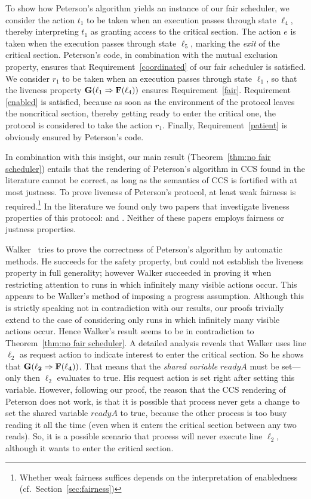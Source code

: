 \documentclass[smallcondensed]{svjour3}
\newcommand{\Thm}[1]{Theorem~\ref{thm:#1}}
\newcommand{\Sect}[1]{Section~\ref{sec:#1}}
\begin{document}
To show how Peterson's algorithm yields an instance of our fair scheduler, we consider the
action $t_1$ to be taken when an execution passes through state $\ell_4$, thereby interpreting $t_1$ as
granting access to the critical section. The action $e$ is taken when the execution passes through state
$\ell_5$, marking the \emph{exit} of the critical section. Peterson's code, in combination
with the mutual exclusion property, ensures that Requirement~\ref{coordinated} of our fair scheduler
is satisfied. We consider $r_1$ to be taken when an execution passes through state $\ell_1$, so that the
liveness property ${\bf{G}}(\ell_{1}\Rightarrow{\bf F}(\ell_{4}))$ ensures Requirement~\ref{fair}.
Requirement \ref{enabled} is satisfied, because as soon as the environment of the protocol leaves
the noncritical section, thereby getting ready to enter the critical one, the protocol is considered
to take the action $r_1$. Finally, Requirement~\ref{patient} is obviously ensured by Peterson's code.

In combination with this insight, our main result (\Thm{no fair scheduler}) entails that
the rendering of Peterson's algorithm in CCS found in the literature cannot be correct, as long as the semantics of CCS
is fortified with at most justness.
To prove liveness of Peterson's protocol,
 at least weak fairness  is required.\footnote{Whether weak fairness suffices depends on the interpretation of enabledness (cf.\ \Sect{fairness})}
In the literature we found only two papers that investigate
liveness properties of this protocol:
\cite{Walker89} and \cite{Valmari96}. Neither of these papers employs fairness or justness properties.

Walker~\cite{Walker89} tries to prove the correctness of Peterson's algorithm by automatic methods.
He succeeds for the safety property, but could not establish the liveness property
in full generality; however Walker succeeded in
proving it when restricting attention to runs in which infinitely many
visible actions occur. This appears to be Walker's method of imposing a progress assumption.
Although this is strictly speaking not in
contradiction with our results, our proofs trivially extend to the
case of considering only runs in which infinitely many visible actions
occur. Hence Walker's result seems to be in contradiction to 
\Thm{no fair scheduler}.
A detailed analysis reveals that Walker uses line $\ell_{2}$ as request action to indicate 
interest to enter the critical section.
So he shows that $\bf{G}(\ell_{2}\Rightarrow{\bf F}(\ell_{4}))$.
That means that the \emph{shared variable} $readyA$ must 
be set---only then $\ell_{2}$ evaluates to true.
His request action is set right after
setting this variable. 
However, following our proof, the reason that
the CCS rendering of Peterson does not work, is that it is possible that
process \procA never gets a change to set the shared variable $readyA$ to true, because the
other process is too busy reading it all the time (even when it
enters the critical section between any two reads). 
So, it is a possible scenario that process \procA will never execute line $\ell_{2}$, although 
it wants to enter the critical section.
\end{document}
